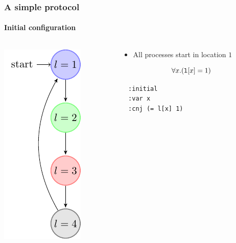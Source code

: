 \begin{frame}[fragile]
  \frametitle{A simple protocol}
  \framesubtitle{Initial configuration}

  \begin{columns}
  \begin{column}{0.3\textwidth}
  \centering
  \includegraphics{pictures/demo-prot1-fig}
  \end{column}
  \begin{column}{0.7\textwidth}
  
  \begin{itemize}
    \item All processes start in location $1$
  \end{itemize}

  $$
  \forall x. ({\tt l}[x] = 1)
  $$

  \pause

  \begin{verbatim}
  :initial
  :var x
  :cnj (= l[x] 1)
  \end{verbatim}
  \end{column}

  \end{columns}  

\end{frame}

